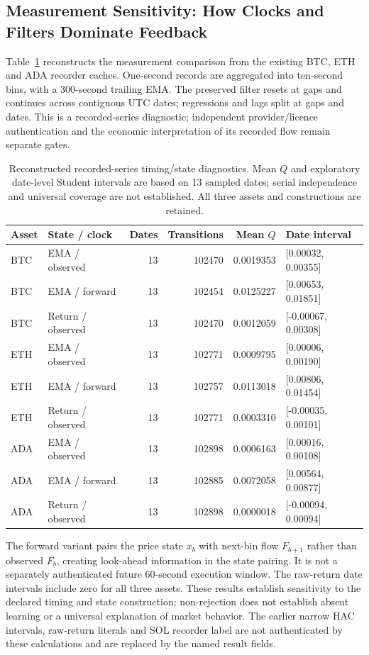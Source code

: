 \documentclass[12pt]{article}
\theoremstyle{definition}
\theoremstyle{remark}
\begin{document}
\subsection{Measurement Sensitivity: How Clocks and Filters Dominate Feedback}
\label{sec:measurement_sensitivity}
Table~\ref{tab:measurement_sensitivity} reconstructs the measurement comparison from the existing BTC, ETH and ADA recorder caches. One-second records are aggregated into ten-second bins, with a 300-second trailing EMA. The preserved filter resets at gaps and continues across contiguous UTC dates; regressions and lags split at gaps and dates. This is a recorded-series diagnostic; independent provider/licence authentication and the economic interpretation of its recorded flow remain separate gates.

\begin{table}[htbp]
\centering\footnotesize
\setlength{\tabcolsep}{3pt}
\caption{Reconstructed recorded-series timing/state diagnostics. Mean $Q$ and exploratory date-level Student intervals are based on 13 sampled dates; serial independence and universal coverage are not established. All three assets and constructions are retained.}
\label{tab:measurement_sensitivity}
\begin{tabular}{llrrrl}\toprule
Asset & State / clock & Dates & Transitions & Mean $Q$ & Date interval \\\midrule
BTC & EMA / observed & 13 & 102470 & 0.0019353 & [0.00032, 0.00355] \\
BTC & EMA / forward & 13 & 102454 & 0.0125227 & [0.00653, 0.01851] \\
BTC & Return / observed & 13 & 102470 & 0.0012059 & [-0.00067, 0.00308] \\
ETH & EMA / observed & 13 & 102771 & 0.0009795 & [0.00006, 0.00190] \\
ETH & EMA / forward & 13 & 102757 & 0.0113018 & [0.00806, 0.01454] \\
ETH & Return / observed & 13 & 102771 & 0.0003310 & [-0.00035, 0.00101] \\
ADA & EMA / observed & 13 & 102898 & 0.0006163 & [0.00016, 0.00108] \\
ADA & EMA / forward & 13 & 102885 & 0.0072058 & [0.00564, 0.00877] \\
ADA & Return / observed & 13 & 102898 & 0.0000018 & [-0.00094, 0.00094] \\
\bottomrule\end{tabular}
\end{table}

The forward variant pairs the price state $x_b$ with next-bin flow $F_{b+1}$ rather than observed $F_b$, creating look-ahead information in the state pairing. It is not a separately authenticated future 60-second execution window. The raw-return date intervals include zero for all three assets. These results establish sensitivity to the declared timing and state construction; non-rejection does not establish absent learning or a universal explanation of market behavior. The earlier narrow HAC intervals, raw-return literals and SOL recorder label are not authenticated by these calculations and are replaced by the named result fields.
\end{document}
